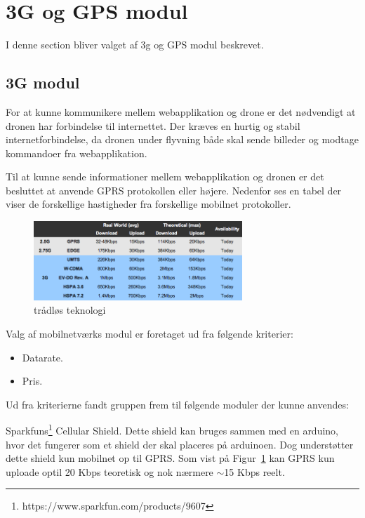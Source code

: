 \section{3G og GPS modul}

I denne section bliver valget af 3g og GPS modul beskrevet. 

\subsection{3G modul}
For at kunne kommunikere mellem webapplikation og drone er det nødvendigt at dronen har forbindelse til internettet. 
Der kræves en hurtig og stabil internetforbindelse, da dronen under flyvning både skal sende billeder og modtage kommandoer fra webapplikation.

Til at kunne sende informationer mellem webapplikation og dronen er det besluttet at anvende GPRS protokollen eller højere. Nedenfor ses en tabel der viser de forskellige hastigheder fra forskellige mobilnet protokoller. 

\begin{figure}[H]
\centering
\includegraphics[width=0.7\textwidth]{Billeder/3g-table.png}
\caption[trådløs_teknologi]{trådløs teknologi\protect\footnotemark}
\label{fig:3gtable}
\end{figure}


Valg af mobilnetværks modul er foretaget ud fra følgende kriterier:
\begin{itemize}
	\item Datarate.
	\item Pris.
\end{itemize}

Ud fra kriterierne fandt gruppen frem til følgende moduler der kunne anvendes:

Sparkfuns\footnote{https://www.sparkfun.com/products/9607} Cellular Shield. \newline 
Dette shield kan bruges sammen med en arduino, hvor det fungerer som et shield der skal placeres på arduinoen.
Dog understøtter dette shield kun mobilnet op til GPRS. Som vist på Figur~\ref{fig:3gtable} kan GPRS kun uploade optil 20 Kbps teoretisk og nok nærmere $\sim$15 Kbps reelt.

